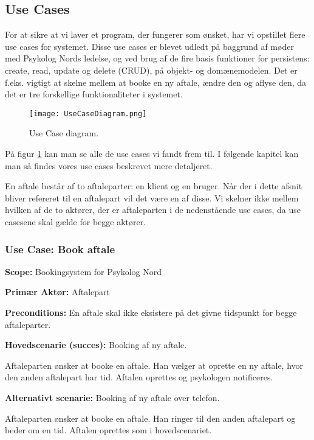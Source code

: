 \subsection{Use Cases}
For at sikre at vi laver et program, der fungerer som ønsket, har vi opstillet flere use cases for systemet.
Disse use cases er blevet udledt på baggrund af møder med Psykolog Nords ledelse, og ved brug af de fire basis funktioner for persistens: create, read, update og delete (CRUD), på objekt- og domænemodelen. 
Det er f.eks. vigtigt at skelne mellem at booke en ny aftale, ændre den og aflyse den, da det er tre forskellige funktionaliteter i systemet.

\begin{figure}[p]
	\centering
  		\texttt{[image: UseCaseDiagram.png]}
  \caption{Use Case diagram.}
  \label{fig:UseCaseDiagram}
\end{figure}

På figur \ref{fig:UseCaseDiagram} kan man se alle de use cases vi fandt frem til. 
I følgende kapitel kan man så findes vores use cases beskrevet mere detaljeret.

En aftale består af to aftaleparter: en klient og en bruger. 
Når der i dette afsnit bliver refereret til en aftalepart vil det være en af disse. 
Vi skelner ikke mellem hvilken af de to aktører, der er aftaleparten i de nedenstående use cases, da use casesene skal gælde for begge aktører.

\subsubsection{Use Case: Book aftale}\label{usecase:bookaftale}
{\setlength{\parindent}{0cm}
\textbf{Scope:} Bookingsystem for Psykolog Nord

\textbf{Primær Aktør:} Aftalepart

\textbf{Preconditions:} En aftale skal ikke eksistere på det givne tidspunkt for begge aftaleparter.

\textbf{Hovedscenarie (succes):} Booking af ny aftale.

Aftaleparten ønsker at booke en aftale. 
Han vælger at oprette en ny aftale, hvor den anden aftalepart har tid. 
Aftalen oprettes og psykologen notificeres.

\textbf{Alternativt scenarie:} Booking af ny aftale over telefon.

Aftaleparten ønsker at booke en aftale. Han ringer til den anden aftalepart og beder om en tid. Aftalen oprettes som i hovedscenariet.
}

